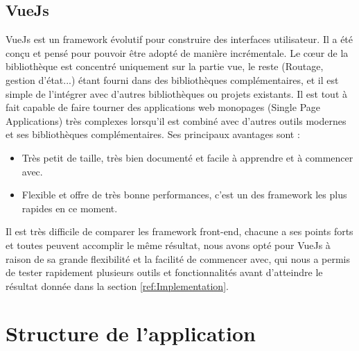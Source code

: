 \subsection{VueJs}
VueJs \cite{VueJs} est un framework évolutif pour construire des interfaces utilisateur. Il a été conçu et pensé pour pouvoir être adopté de manière incrémentale. Le cœur de la bibliothèque est concentré uniquement sur la partie vue, le reste (Routage, gestion d'état...) étant fourni dans des bibliothèques complémentaires, et il est simple de l'intégrer avec d'autres bibliothèques ou projets existants. 
Il est tout à fait capable de faire tourner des applications web monopages (Single Page Applications) très complexes lorsqu'il est combiné avec d'autres outils modernes et ses bibliothèques complémentaires.\newline
Ses principaux avantages sont : 
\begin{itemize}
	\item Très petit de taille, très bien documenté et facile à apprendre et à commencer avec.
	\item Flexible et offre de très bonne performances, c'est un des framework les plus rapides en ce moment.
\end{itemize}

Il est très difficile de comparer les framework front-end, chacune a ses points forts et toutes peuvent accomplir le même résultat, nous avons opté pour VueJs à raison de sa grande flexibilité et la facilité de commencer avec, qui nous a permis de tester rapidement plusieurs outils et fonctionnalités avant d'atteindre le résultat donnée dans la section \ref{ref:Implementation}.

\section{Structure de l'application}

